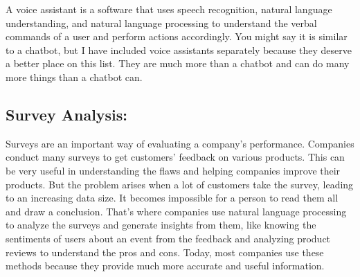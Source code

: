 A voice assistant is a software that uses speech recognition, natural language understanding, and natural language processing to understand the verbal commands of a user and perform actions accordingly. You might say it is similar to a chatbot, but I have included voice assistants separately because they deserve a better place on this list. They are much more than a chatbot and can do many more things than a chatbot can.
\subsection{Survey Analysis:}

Surveys are an important way of evaluating a company’s performance. Companies conduct many surveys to get customers’ feedback on various products. This can be very useful in understanding the flaws and helping companies improve their products.
But the problem arises when a lot of customers take the survey, leading to an increasing data size. It becomes impossible for a person to read them all and draw a conclusion. That’s where companies use natural language processing to analyze the surveys and generate insights from them, like knowing the sentiments of users about an event from the feedback and analyzing product reviews to understand the pros and cons. Today, most companies use these methods because they provide much more accurate and useful information.



      
       
       

